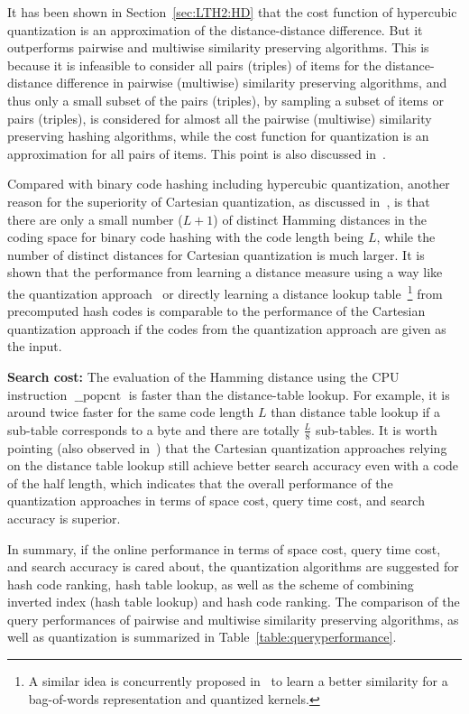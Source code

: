 \documentclass[10pt,journal,compsoc]{IEEEtran}
\begin{document}
It has been shown in Section~\ref{sec:LTH2:HD}
that
the cost function of hypercubic quantization
is an approximation of the distance-distance difference.
But it outperforms pairwise and multiwise
similarity preserving algorithms.
This is because it is infeasible to
consider all pairs (triples) of items for the distance-distance difference
in pairwise (multiwise) similarity preserving algorithms,
and thus only a small subset of the pairs (triples),
by sampling a subset of items or pairs (triples),
is considered
for almost all the pairwise (multiwise) similarity preserving hashing algorithms,
while the cost function for quantization
is an approximation for all pairs of items.
This point is also discussed in~\cite{WangZQTW16}.


Compared with binary code hashing including
hypercubic quantization,
another reason for the superiority of Cartesian quantization,
as discussed in~\cite{ZhangDW14},
is that there are only a small number ($L+1$) of distinct Hamming distances
in the coding space for binary code hashing
with the code length being $L$,
while the number of distinct distances for Cartesian quantization
is much larger.
It is shown
that
the performance from learning a distance measure using a way like the quantization approach~\cite{GordoPGL14}
or directly learning a distance lookup table~\cite{WangSYYLW14}\footnote{A similar idea is concurrently proposed
in~\cite{QinCGG14a,QinCGG14b} to learn a better similarity for a bag-of-words representation
and quantized kernels.}
from precomputed hash codes
is comparable to the performance of the Cartesian quantization approach
if the codes from the quantization approach are given as the input.



\textbf{Search cost:}
The evaluation of the Hamming distance
using the CPU instruction $\operatorname{\_\_popcnt}$
is faster than the distance-table lookup.
For example,
it is around twice faster for the same code length $L$
than distance table lookup
if a sub-table corresponds to a byte
and there are totally $\frac{L}{8}$ sub-tables.
It is worth pointing
(also observed in~\cite{ZhangDW14})
that the Cartesian quantization approaches relying on the distance table lookup
still achieve better search accuracy
even with a code of the half length,
which indicates that
the overall performance of the quantization approaches
in terms of space cost, query time cost, and search accuracy
is superior.

In summary,
if the online performance in terms of
space cost, query time cost,
and search accuracy
is cared about,
the quantization algorithms are suggested
for hash code ranking, hash table lookup,
as well as
the scheme of combining inverted index (hash table lookup) and hash code ranking.
The comparison of the query performances
of pairwise and multiwise similarity preserving algorithms, as well as quantization
is summarized in Table~\ref{table:queryperformance}.
\end{document}

